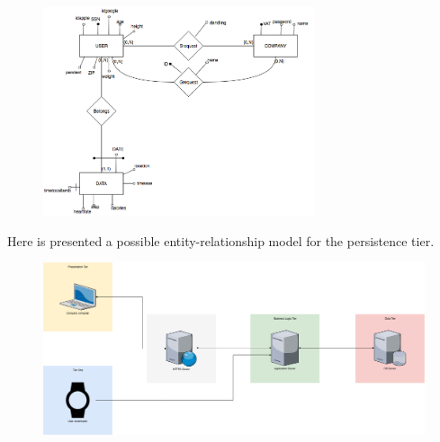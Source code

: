 \documentclass{article}
\begin{document}
\begin{figure}[h!]
\centering
	\includegraphics[width= 80mm, scale=0.7]{ER.png}
\end{figure}
Here is presented a possible entity-relationship model for the persistence tier.
\begin{figure}	
	\includegraphics[width= \linewidth]{tier.png}
\end{figure}
\newpage
\newpage
\end{document}
